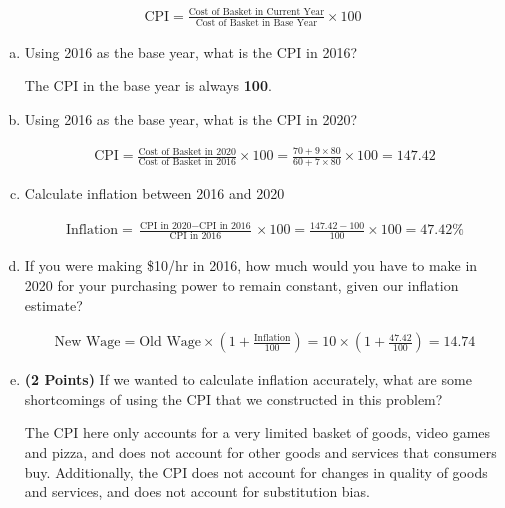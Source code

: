 \documentclass{article}
\begin{document}
\begin{align*}
    \text{CPI} = \frac{\text{Cost of Basket in Current Year}}{\text{Cost of Basket in Base Year}} \times 100
\end{align*}

\begin{enumerate}[(a)]
    \item Using 2016 as the base year, what is the CPI in 2016?

    The CPI in the base year is always \textbf{100}.

    \item Using 2016 as the base year, what is the CPI in 2020?
    
    \begin{align*}
        \text{CPI} = \frac{\text{Cost of Basket in 2020}}{\text{Cost of Basket in 2016}} \times 100 = \frac{70 + 9 \times 80}{60 + 7 \times 80} \times 100 = 147.42
    \end{align*}

    \item Calculate inflation between 2016 and 2020
    
    \begin{align*}
        \text{Inflation} = \frac{\text{CPI in 2020} - \text{CPI in 2016}}{\text{CPI in 2016}} \times 100 = \frac{147.42 - 100}{100} \times 100 = 47.42\%
    \end{align*}

    \item If you were making \$10/hr in 2016, how much would you have to make in 2020 for your purchasing power to remain constant, given our inflation estimate?
    
    \begin{align*}
        \text{New Wage} = \text{Old Wage} \times \left(1 + \frac{\text{Inflation}}{100}\right) = 10 \times \left(1 + \frac{47.42}{100}\right) = 14.74
    \end{align*}

    \item \textbf{(2 Points)} If we wanted to calculate inflation accurately, what are some shortcomings of using the CPI that we constructed in this problem?
    
    The CPI here only accounts for a very limited basket of goods, video games and pizza, and does not account for other goods and services that consumers buy. Additionally, the CPI does not account for changes in quality of goods and services, and does not account for substitution bias.

\end{enumerate}
\end{document}
